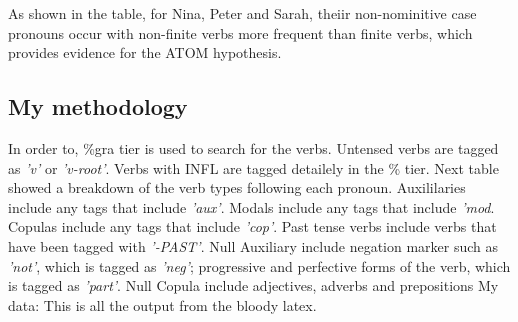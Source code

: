 As shown in the table, for Nina, Peter and Sarah, theiir non-nominitive case pronouns occur with non-finite verbs more frequent than finite verbs, which provides evidence for the ATOM hypothesis. 


\subsection{My methodology}
In order to, \%gra tier is used to search for the verbs. Untensed verbs are tagged as \textit{'v'} or \textit{'v-root'}. Verbs with INFL are tagged detailely in the \% tier. Next table showed a breakdown of the verb types following each pronoun. 
Auxililaries include any tags that include \textit{'aux'}. Modals include any tags that include \textit{'mod}. Copulas include any tags that include \textit{'cop'}. Past tense verbs include verbs that have been tagged with \textit{'-PAST'}. Null Auxiliary include negation marker such as \textit{'not'}, which is tagged as \textit{'neg'}; progressive and perfective forms of the verb, which is tagged as \textit{'part'}. Null Copula include adjectives, adverbs and prepositions %
My data:
This is all the output from the bloody latex. 
    



